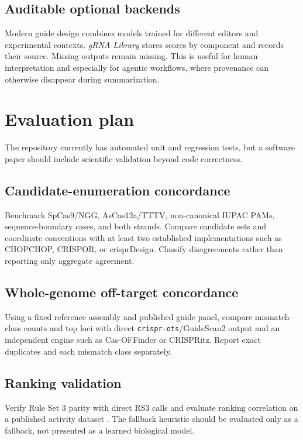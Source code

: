 \documentclass[11pt]{article}
\newcommand{\grnalib}{\textit{gRNA Library}}
\begin{document}
\subsection{Auditable optional backends}

Modern guide design combines models trained for different editors and experimental contexts. \grnalib{} stores scores by component and records their source. Missing outputs remain missing. This is useful for human interpretation and especially for agentic workflows, where provenance can otherwise disappear during summarization.

\section{Evaluation plan}

The repository currently has automated unit and regression tests, but a software paper should include scientific validation beyond code correctness.

\subsection{Candidate-enumeration concordance}

Benchmark SpCas9/NGG, AsCas12a/TTTV, non-canonical IUPAC PAMs, sequence-boundary cases, and both strands. Compare candidate sets and coordinate conventions with at least two established implementations such as CHOPCHOP, CRISPOR, or crisprDesign. Classify disagreements rather than reporting only aggregate agreement.

\subsection{Whole-genome off-target concordance}

Using a fixed reference assembly and published guide panel, compare mismatch-class counts and top loci with direct \texttt{crispr-ots}/GuideScan2 output and an independent engine such as Cas-OFFinder or CRISPRitz. Report exact duplicates and each mismatch class separately.

\subsection{Ranking validation}

Verify Rule Set 3 parity with direct RS3 calls and evaluate ranking correlation on a published activity dataset \citep{deweirdt2022rs3}. The fallback heuristic should be evaluated only as a fallback, not presented as a learned biological model.
\end{document}
